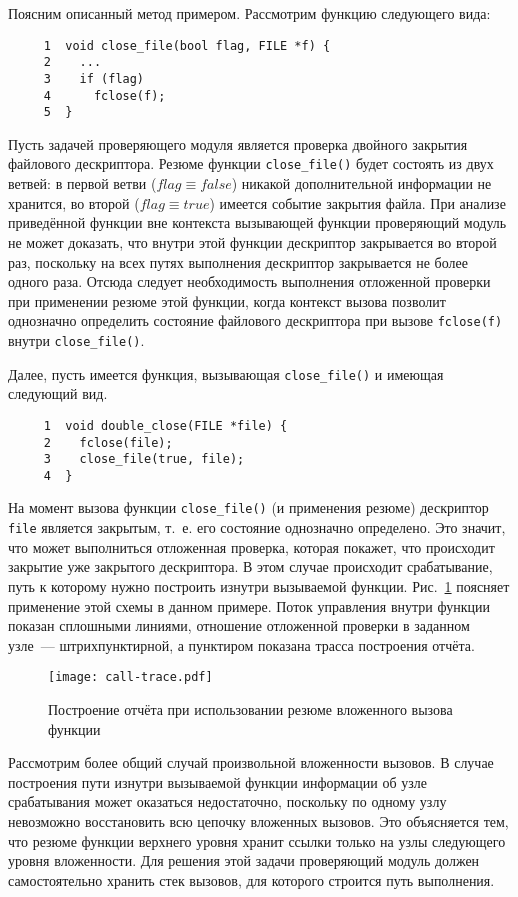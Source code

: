 Поясним описанный метод примером. Рассмотрим функцию следующего вида:

\begin{verbatim}
     1  void close_file(bool flag, FILE *f) {
     2    ...
     3    if (flag)
     4      fclose(f);
     5  }
\end{verbatim}

Пусть задачей проверяющего модуля является проверка двойного закрытия файлового дескриптора. Резюме функции \texttt{close\_file()} будет состоять из двух ветвей: в первой ветви ($flag \equiv false$) никакой дополнительной информации не хранится, во второй ($flag \equiv true$) имеется событие закрытия файла. При анализе приведённой функции вне контекста вызывающей функции проверяющий модуль не может доказать, что внутри этой функции дескриптор закрывается во второй раз, поскольку на всех путях выполнения дескриптор закрывается не более одного раза. Отсюда следует необходимость выполнения отложенной проверки при применении резюме этой функции, когда контекст вызова позволит однозначно определить состояние файлового дескриптора при вызове \texttt{fclose(f)} внутри \texttt{close\_file()}.

Далее, пусть имеется функция, вызывающая \texttt{close\_file()} и имеющая следующий вид.

\begin{verbatim}
     1  void double_close(FILE *file) {
     2    fclose(file);
     3    close_file(true, file);
     4  }
\end{verbatim}

На момент вызова функции \texttt{close\_file()} (и применения резюме) дескриптор \texttt{file} является закрытым, т.~е. его состояние однозначно определено. Это значит, что может выполниться отложенная проверка, которая покажет, что происходит закрытие уже закрытого дескриптора. В этом случае происходит срабатывание, путь к которому нужно построить изнутри вызываемой функции. Рис.~\ref{pic:call-trace} поясняет применение этой схемы в данном примере. Поток управления внутри функции показан сплошными линиями, отношение отложенной проверки в заданном узле~--- штрихпунктирной, а пунктиром показана трасса построения отчёта.

\begin{figure}
   \centering
   \texttt{[image: call-trace.pdf]}
   \caption{Построение отчёта при использовании резюме вложенного вызова функции}\label{pic:call-trace}
\end{figure}


Рассмотрим более общий случай произвольной вложенности вызовов. В случае построения пути изнутри вызываемой функции информации об узле срабатывания может оказаться недостаточно, поскольку по одному узлу невозможно восстановить всю цепочку вложенных вызовов. Это объясняется тем, что резюме функции верхнего уровня хранит ссылки только на узлы следующего уровня вложенности. Для решения этой задачи проверяющий модуль должен самостоятельно хранить стек вызовов, для которого строится путь выполнения.

